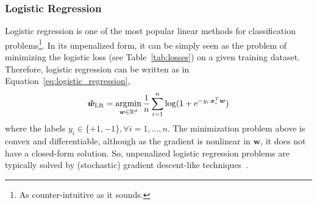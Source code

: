

			\subsubsection{Logistic Regression} \label{sec:logistic_regression}
			Logistic regression is one of the most popular linear methods for classification problems\footnote{ As counter-intuitive as it sounds.}. In its unpenalized form, it can be simply seen as the problem of minimizing the logistic loss (see Table~\ref{tab:losses}) on a given training dataset. Therefore, logistic regression can be written as in Equation~\eqref{eq:logistic_regression},
			\begin{equation} \label{eq:logistic_regression}
				\bm{\hat w}_{\text{LR}} = \mathop{\mathrm{argmin}}\limits_{\bm{w} \in \mathbb{R}^d} \frac{1}{n}\sum_{i=1}^n\log(1 + e^{-y_i\,\bm{x}_i^T\bm{w}})
			\end{equation}
			where the labels $y_i \in \{+1,-1\}, \forall i=1,\dots,n$. The minimization problem above is convex and differentiable, although as the gradient is nonlinear in $\bm{w}$, it does not have a closed-form solution. So, unpenalized logistic regression problems are typically solved by (stochastic) gradient descent-like techniques~\cite{boyd2004convex, sra2012optimization}.

